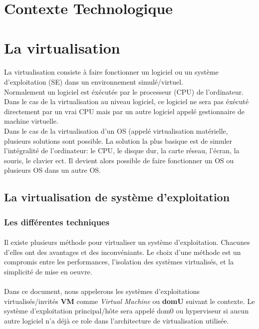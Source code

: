 \section{Contexte Technologique}

\section{La virtualisation}
\label{virtualisation}
\paragraph*{}
La virtualisation consiste à faire fonctionner un logiciel ou un système d'exploitation (SE) dans un environnement simulé/virtuel.
\\
Normalement un logiciel est éxécutée par le processeur (CPU) de l'ordinateur. Dans le cas de la virtualisation au niveau logiciel,
ce logiciel ne sera pas éxécuté directement par un vrai CPU mais par un autre logiciel appelé gestionnaire de machine virtuelle.
\\
Dans le cas de la virtualisation d'un OS (appelé virtualisation matérielle, plusieurs solutions sont possible. La solution la plus basique est de simuler l'intégralité
de l'ordinateur: le CPU, le disque dur, la carte réseau, l'écran, la souris, le clavier ect.
Il devient alors possible de faire fonctionner un OS ou plusieurs OS dans un autre OS.

\subsection{La virtualisation de système d'exploitation}
\label{virtualisation_mat}
\subsubsection{Les différentes techniques}
\paragraph*{}
Il existe plusieurs méthode pour virtualiser un système d'exploitation. Chacunes d'elles ont des avantages et des
inconvéniants. Le choix d'une méthode est un compromis entre les performances, l'isolation des systèmes virtualisés,
et la simplicité de mise en oeuvre.

\paragraph*{}
Dans ce document, nous appelerons les systèmes d'exploitations virtualisés/invités \textbf{VM} comme \emph{Virtual Machine} ou \textbf{domU} suivant le contexte.
Le système d'exploitation principal/hôte sera appelé dom0 ou hyperviseur si aucun autre logiciel n'a déjà ce role dans l'architecture de virtualisation
utilisée.


